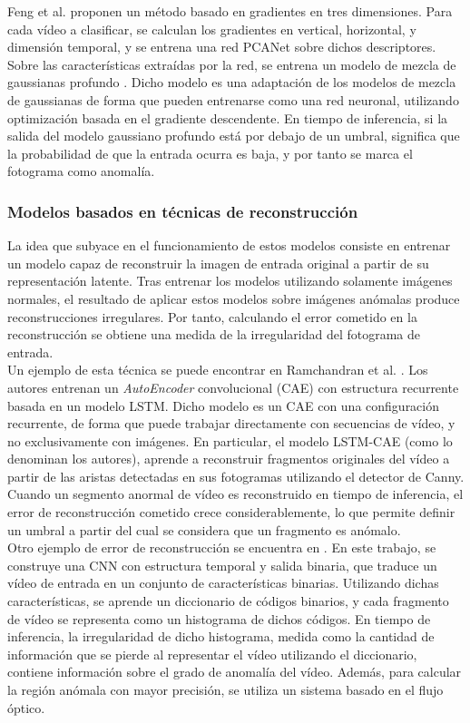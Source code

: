 \documentclass[../main.tex]{memoir}
\begin{document}
Feng et al. \cite{feng2017learning} proponen un método basado en
gradientes en tres dimensiones. Para cada vídeo a clasificar, se
calculan los gradientes en vertical, horizontal, y dimensión temporal,
y se entrena una red PCANet \cite{chan2015pcanet} sobre dichos
descriptores. Sobre las características extraídas por la red, se
entrena un modelo de mezcla de gaussianas profundo
\cite{viroli2019deep}. Dicho modelo es una adaptación de los modelos
de mezcla de gaussianas de forma que pueden entrenarse como una red
neuronal, utilizando optimización basada en el gradiente descendente.
En tiempo de inferencia, si la salida del modelo gaussiano profundo
está por debajo de un umbral, significa que la probabilidad de que
la entrada ocurra es baja, y por tanto se marca el fotograma como
anomalía.

\subsubsection{Modelos basados en técnicas de reconstrucción}

La idea que subyace en el funcionamiento de estos modelos consiste en
entrenar un modelo capaz de reconstruir la imagen de entrada original
a partir de su representación latente. Tras entrenar los modelos
utilizando solamente imágenes normales, el resultado de aplicar estos
modelos sobre imágenes anómalas produce reconstrucciones irregulares.
Por tanto, calculando el error cometido en la reconstrucción se obtiene
una medida de la irregularidad del fotograma de entrada.\\

Un ejemplo de esta técnica se puede encontrar en Ramchandran et al.
\cite{ramchandran2019unsupervised}. Los autores entrenan un
\textit{AutoEncoder} convolucional (CAE) con estructura recurrente
basada en un modelo LSTM. Dicho modelo es un CAE con una configuración
recurrente, de forma que puede trabajar directamente con secuencias de
vídeo, y no exclusivamente con imágenes. En particular, el modelo
LSTM-CAE (como lo denominan los autores), aprende a reconstruir
fragmentos originales del vídeo a partir de las aristas detectadas en
sus fotogramas utilizando el detector de Canny. Cuando un segmento
anormal de vídeo es reconstruido en tiempo de inferencia, el error
de reconstrucción cometido crece considerablemente, lo que permite
definir un umbral a partir del cual se considera que un fragmento
es anómalo.\\

Otro ejemplo de error de reconstrucción se encuentra en
\cite{ravanbakhsh2018plug}. En este trabajo, se construye una CNN con
estructura temporal y salida binaria, que traduce un vídeo de entrada
en un conjunto de características binarias. Utilizando dichas
características, se aprende un diccionario de códigos binarios, y cada
fragmento de vídeo se representa como un histograma de dichos códigos.
En tiempo de inferencia, la irregularidad de dicho histograma, medida
como la cantidad de información que se pierde al representar el vídeo
utilizando el diccionario, contiene información sobre el grado de
anomalía del vídeo. Además, para calcular la región anómala con mayor
precisión, se utiliza un sistema basado en el flujo óptico.
\end{document}
